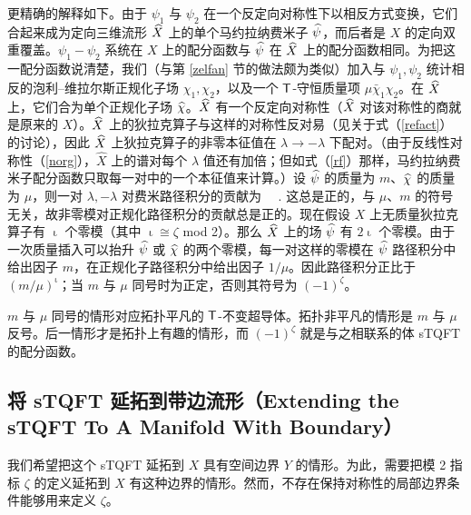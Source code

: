 更精确的解释如下。由于 $\psi_1$ 与 $\psi_2$ 在一个反定向对称性下以相反方式变换，它们合起来成为定向三维流形 $\widehat X$ 上的单个马约拉纳费米子 $\widehat\psi$，而后者是 $X$ 的定向双重覆盖。$\psi_1-\psi_2$ 系统在 $X$ 上的配分函数与 $\widehat \psi$ 在 $\widehat X$ 上的配分函数相同。为把这一配分函数说清楚，我们（与第 \ref{zelfan} 节的做法颇为类似）加入与 $\psi_1,\psi_2$ 统计相反的泡利--维拉尔斯正规化子场 $\chi_1,\chi_2$，以及一个 ${\sf T}$-守恒质量项 $\mu\bar\chi_1\chi_2$。在 $\widehat X$ 上，它们合为单个正规化子场 $\widehat\chi$。$\widehat X$ 有一个反定向对称性（$\widehat X$ 对该对称性的商就是原来的 $X$）。$\widehat X$ 上的狄拉克算子与这样的对称性反对易（见关于式（\ref{refact}）的讨论），因此 $\widehat X$ 上狄拉克算子的非零本征值在 $\lambda\to-\lambda$ 下配对。（由于反线性对称性（\ref{norg}），$\hat X$ 上的谱对每个 $\lambda$ 值还有加倍；但如式（\ref{rf}）那样，马约拉纳费米子配分函数只取每一对中的一个本征值来计算。）设 $\widehat\psi$ 的质量为 $m$、$\widehat\chi$ 的质量为 $\mu$，则一对 $\lambda,-\lambda$ 对费米路径积分的贡献为
\be\label{zeffo}~~. \ee
这总是正的，与 $\mu$、$m$ 的符号无关，故非零模对正规化路径积分的贡献总是正的。现在假设 $X$ 上无质量狄拉克算子有 $\upiota$ 个零模（其中 $\upiota\cong\zeta$ mod 2）。那么 $\widehat X$ 上的场 $\widehat\psi$ 有 $2\upiota$ 个零模。由于一次质量插入可以抬升 $\widehat\psi$ 或 $\widehat\chi$ 的两个零模，每一对这样的零模在 $\widehat\psi$ 路径积分中给出因子 $m$，在正规化子路径积分中给出因子 $1/\mu$。因此路径积分正比于 $(m/\mu)^\upiota$；当 $m$ 与 $\mu$ 同号时为正定，否则其符号为 $(-1)^\zeta$。


$m$ 与 $\mu$ 同号的情形对应拓扑平凡的 ${\sf T}$-不变超导体。拓扑非平凡的情形是 $m$ 与 $\mu$ 反号。后一情形才是拓扑上有趣的情形，而 $(-1)^\zeta$ 就是与之相联系的体 sTQFT 的配分函数。

\subsection{将 sTQFT 延拓到带边流形（Extending the sTQFT To A Manifold With Boundary）}\label{extending}

我们希望把这个 sTQFT 延拓到 $X$ 具有空间边界 $Y$ 的情形。为此，需要把模 2 指标 $\zeta$ 的定义延拓到 $X$ 有这种边界的情形。然而，不存在保持对称性的局部边界条件能够用来定义 $\zeta$。

